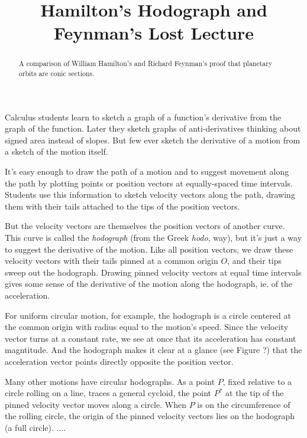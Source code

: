 \documentclass{ximera}
\title{Hamilton's Hodograph and Feynman's Lost Lecture}
\begin{document}
\begin{abstract}
A comparison of William Hamilton's and Richard Feynman's proof that planetary orbits are conic sections.
\end{abstract}
\maketitle

Calculus students learn to sketch a graph of a function's derivative from the graph of the function. Later they sketch graphs of anti-derivatives thinking about signed area instead of slopes. But few ever sketch the derivative of a motion from a sketch of the motion itself.

It's easy enough to draw the path of a motion and to suggest movement along the path by plotting points or position vectors at equally-spaced time intervals. Students use this information to sketch velocity vectors along the path, drawing them with their tails attached to the tips of the position vectors.

But the velocity vectors are themselves the position vectors of another curve. This curve is called the \emph{hodograph} (from the Greek \emph{hodo}, way), but it's just a way to suggest the derivative of the motion. Like all position vectors, we draw these velocity vectors with their tails pinned at a common origin $O$, and their tips sweep out the hodograph. Drawing pinned velocity vectors at equal time intervals gives some sense of the derivative of the motion along the hodograph, ie. of the acceleration.

For uniform circular motion, for example, the hodograph is a circle centered at the common origin with radius equal to the motion's speed. Since the velocity vector turns at a constant rate, we see at once that its acceleration has constant magntitude. And the hodograph makes it clear at a glance (see Figure ?) that the acceleration vector points directly opposite the position vector.

Many other motions have circular hodographs. As a point $P$, fixed relative to a circle rolling on a line, traces a general cycloid, the point $P^*$ at the tip of the pinned velocity vector moves along a circle. When $P$ is on the circumference of the rolling circle, the origin of the pinned velocity vectors lies on the hodograph (a full circle). .... 

\end{document}
